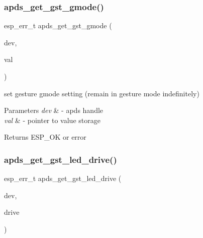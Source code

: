 \subsubsection{\texorpdfstring{apds\+\_\+get\+\_\+gst\+\_\+gmode()}{apds\_get\_gst\_gmode()}}
{\footnotesize\ttfamily esp\+\_\+err\+\_\+t apds\+\_\+get\+\_\+gst\+\_\+gmode (\begin{DoxyParamCaption}\item[{\hyperlink{structAPDS9960__Driver}{A\+P\+D\+S\+\_\+\+D\+EV}}]{dev,  }\item[{\hyperlink{vl53l0x__types_8h_aba7bc1797add20fe3efdf37ced1182c5}{uint8\+\_\+t} $\ast$}]{val }\end{DoxyParamCaption})}




\begin{DoxyItemize}
\item set gesture gmode setting (remain in gesture mode indefinitely) 
\end{DoxyItemize}


\begin{DoxyParams}{Parameters}
{\em dev} & -\/ apds handle \\
\hline
{\em val} & -\/ pointer to value storage \\
\hline
\end{DoxyParams}
\begin{DoxyReturn}{Returns}
E\+S\+P\+\_\+\+OK or error 
\end{DoxyReturn}
\mbox{\label{group__APDS9960__GestureFunctions_ga90bd6b0107185604545dc0cf875287c8}} 
\subsubsection{\texorpdfstring{apds\+\_\+get\+\_\+gst\+\_\+led\+\_\+drive()}{apds\_get\_gst\_led\_drive()}}
{\footnotesize\ttfamily esp\+\_\+err\+\_\+t apds\+\_\+get\+\_\+gst\+\_\+led\+\_\+drive (\begin{DoxyParamCaption}\item[{\hyperlink{structAPDS9960__Driver}{A\+P\+D\+S\+\_\+\+D\+EV}}]{dev,  }\item[{apds\+\_\+led\+\_\+drive\+\_\+t $\ast$}]{drive }\end{DoxyParamCaption})}




